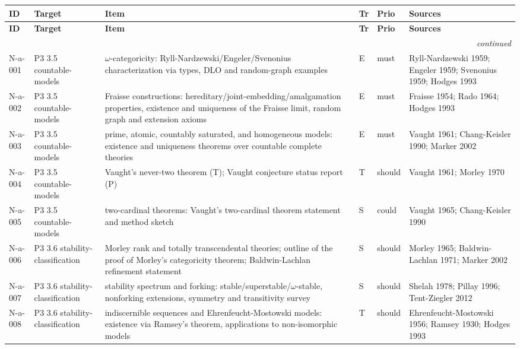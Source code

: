 \begingroup\scriptsize\setlength{\tabcolsep}{3pt}
\begin{longtable}{@{}p{0.52in}p{0.85in}p{2.5in}p{0.22in}p{0.42in}p{1.95in}@{}}
\toprule
\textbf{ID} & \textbf{Target} & \textbf{Item} & \textbf{Tr} & \textbf{Prio} & \textbf{Sources} \\
\midrule
\endfirsthead
\toprule
\textbf{ID} & \textbf{Target} & \textbf{Item} & \textbf{Tr} & \textbf{Prio} & \textbf{Sources} \\
\midrule
\endhead
\midrule\multicolumn{6}{r}{\emph{continued}}\\\endfoot
\bottomrule\endlastfoot
N-a-001 & P3 3.5 countable-models & \(\omega\)-categoricity: Ryll-Nardzewski/Engeler/Svenonius characterization via types, DLO and random-graph examples & E & must & Ryll-Nardzewski 1959; Engeler 1959; Svenonius 1959; Hodges 1993 \\
N-a-002 & P3 3.5 countable-models & Fraisse constructions: hereditary/joint-embedding/amalgamation properties, existence and uniqueness of the Fraisse limit, random graph and extension axioms & E & must & Fraisse 1954; Rado 1964; Hodges 1993 \\
N-a-003 & P3 3.5 countable-models & prime, atomic, countably saturated, and homogeneous models: existence and uniqueness theorems over countable complete theories & E & must & Vaught 1961; Chang-Keisler 1990; Marker 2002 \\
N-a-004 & P3 3.5 countable-models & Vaught's never-two theorem (T); Vaught conjecture status report (P) & T & should & Vaught 1961; Morley 1970 \\
N-a-005 & P3 3.5 countable-models & two-cardinal theorems: Vaught's two-cardinal theorem statement and method sketch & S & could & Vaught 1965; Chang-Keisler 1990 \\
N-a-006 & P3 3.6 stability-classification & Morley rank and totally transcendental theories; outline of the proof of Morley's categoricity theorem; Baldwin-Lachlan refinement statement & S & should & Morley 1965; Baldwin-Lachlan 1971; Marker 2002 \\
N-a-007 & P3 3.6 stability-classification & stability spectrum and forking: stable/superstable/\(\omega\)-stable, nonforking extensions, symmetry and transitivity survey & S & should & Shelah 1978; Pillay 1996; Tent-Ziegler 2012 \\
N-a-008 & P3 3.6 stability-classification & indiscernible sequences and Ehrenfeucht-Mostowski models: existence via Ramsey's theorem, applications to non-isomorphic models & T & should & Ehrenfeucht-Mostowski 1956; Ramsey 1930; Hodges 1993 \\

\end{longtable}
